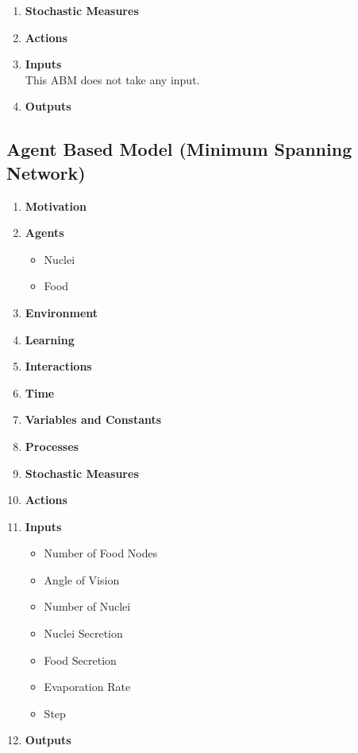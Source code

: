 \documentclass[a4paper, 11pt]{article}
\begin{document}
\begin{enumerate}
\begin{itemize}
    \end{itemize}
    
    \item \textbf{Stochastic Measures}
    
    \item \textbf{Actions}
    
    \item \textbf{Inputs} \\
    This ABM does not take any input. 
    \item \textbf{Outputs}
    
    \end{enumerate}
    
\newpage
\subsection{Agent Based Model (Minimum Spanning Network)}
    
\begin{enumerate}
    \item \textbf{Motivation}
    \item \textbf{Agents}
    \begin{itemize}
        \item Nuclei 
        \item Food 
    \end{itemize}
    \item \textbf{Environment}
    \item \textbf{Learning}
    \item \textbf{Interactions}
    \item \textbf{Time}
    
    \item \textbf{Variables and Constants}
    \item \textbf{Processes}
    \item \textbf{Stochastic Measures}
    \item \textbf{Actions}
    \item \textbf{Inputs}
    \begin{itemize}
        \item Number of Food Nodes
        \item Angle of Vision
        \item Number of Nuclei
        \item Nuclei Secretion
        \item Food Secretion
        \item Evaporation Rate
        \item Step
    \end{itemize}
    \item \textbf{Outputs}
    \end{enumerate}
\newpage
\end{document}
